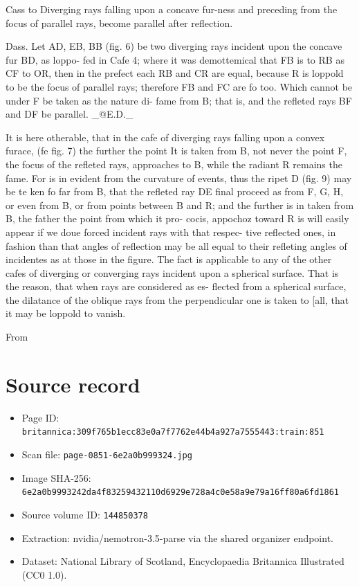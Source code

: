 \documentclass{article}
\begin{document}
Cass to Diverging rays falling upon a concave fur-ness and preceding from the focus of parallel rays, become parallel after reflection.

Dass. Let AD, EB, BB (fig. 6) be two diverging rays incident upon the concave fur BD, as loppo- fed in Cafe 4; where it was demottemical that FB is to RB as CF to OR, then in the prefect each RB and CR are equal, because R is loppold to be the focus of parallel rays; therefore FB and FC are fo too. Which cannot be under F be taken as the nature di- fame from B; that is, and the refleted rays BF and DF be parallel. \_@E.D.\_

It is here otherable, that in the cafe of diverging rays falling upon a convex furace, (fe fig. 7) the further the point It is taken from B, not never the point F, the focus of the refleted rays, approaches to B, while the radiant R remains the fame. For is in evident from the curvature of events, thus the ripet D (fig. 9) may be te ken fo far from B, that the refleted ray DE final proceed as from F, G, H, or even from B, or from points between B and R; and the further is in taken from B, the father the point from which it pro- cocis, appochoz toward R is will easily appear if we doue forced incident rays with that respec- tive reflected ones, in fashion than that angles of reflection may be all equal to their refleting angles of incidentes as at those in the figure. The fact is applicable to any of the other cafes of diverging or converging rays incident upon a spherical surface. That is the reason, that when rays are considered as es- flected from a spherical surface, the dilatance of the oblique rays from the perpendicular one is taken to [all, that it may be loppold to vanish.

From

\section*{Source record}
\begin{itemize}
\item Page ID: \texttt{britannica:309f765b1ecc83e0a7f7762e44b4a927a7555443:train:851}
\item Scan file: \texttt{page-0851-6e2a0b999324.jpg}
\item Image SHA-256: \texttt{6e2a0b9993242da4f83259432110d6929e728a4c0e58a9e79a16ff80a6fd1861}
\item Source volume ID: \texttt{144850378}
\item Extraction: nvidia/nemotron-3.5-parse via the shared organizer endpoint.
\item Dataset: National Library of Scotland, Encyclopaedia Britannica Illustrated (CC0 1.0).
\end{itemize}
\end{document}
